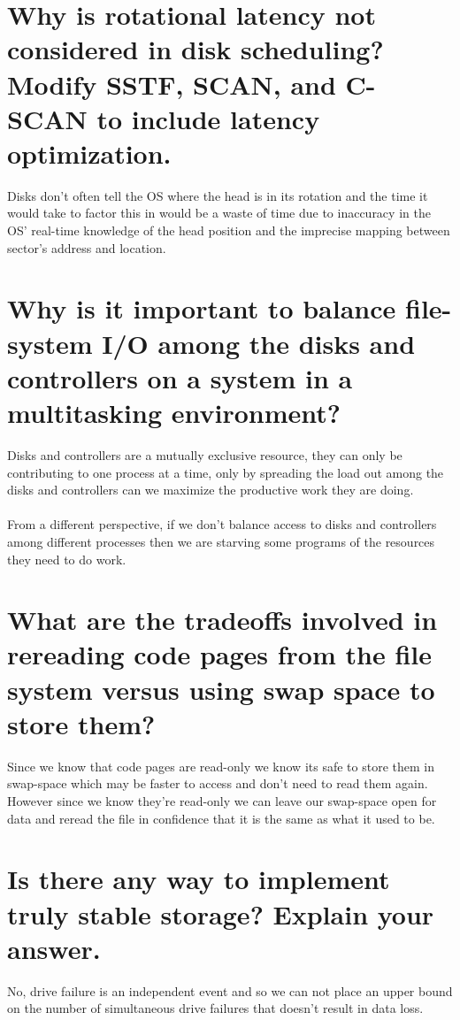 \documentclass{book}%
\begin{document}
\section{Why is rotational latency not considered in disk scheduling? Modify SSTF, SCAN, and C-SCAN to include latency optimization.}
Disks don't often tell the OS where the head is in its rotation and the time it would take to factor this in would be a waste of time due to inaccuracy in the OS' real-time knowledge of the head position and the imprecise mapping between sector's address and location.
\section{Why is it important to balance file-system I/O among the disks and controllers on a system in a multitasking environment?}
Disks and controllers are a mutually exclusive resource, they can only be contributing to one process at a time, only by spreading the load out among the disks and controllers can we maximize the productive work they are doing. 
\paragraph{} From a different perspective, if we don't balance access to disks and controllers among different processes then we are starving some programs of the resources they need to do work.
\section{What are the tradeoffs involved in rereading code pages from the file system versus using swap space to store them?}
Since we know that code pages are read-only we know its safe to store them in swap-space which may be faster to access and don't need to read them again. However since we know they're read-only we can leave our swap-space open for data and reread the file in confidence that it is the same as what it used to be.
\section{Is there any way to implement truly stable storage? Explain your answer.}
No, drive failure is an independent event and so we can not place an upper bound on the number of simultaneous drive failures that doesn't result in data loss.
\end{document}
